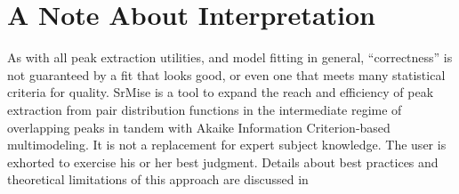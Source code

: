 \documentclass[12pt]{article}
\begin{document}
\section{A Note About Interpretation}
As with all peak extraction utilities, and model fitting in general, ``correctness'' is not guaranteed by a fit that looks good, or even one that meets many statistical criteria for quality.  {\sc SrMise} is a tool to expand the reach and efficiency of peak extraction from pair distribution functions in the intermediate regime of overlapping peaks in tandem with Akaike Information Criterion-based multimodeling.  It is not a replacement for expert subject knowledge. The user is exhorted to exercise his or her best judgment.  Details about best practices and theoretical limitations of this approach are discussed in 
\end{document}
